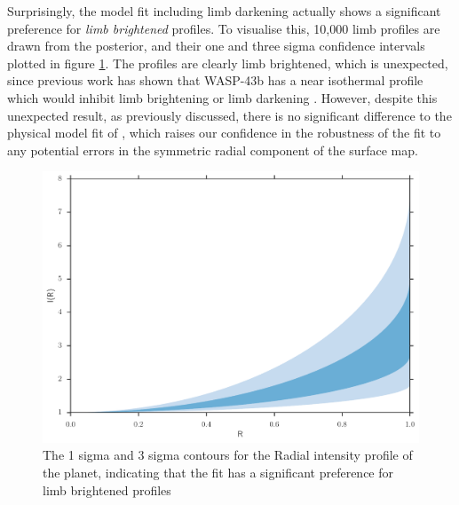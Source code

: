 \documentclass[a4paper,fleqn,usenatbib]{mnras}
\begin{document}
Surprisingly, the model fit including limb darkening actually shows a significant preference for \emph{limb brightened} profiles. To visualise this, 10,000 limb profiles are drawn from the posterior, and their one and three sigma confidence intervals plotted in figure \ref{fig:limb brighten}. The profiles are clearly limb brightened, which is unexpected, since previous work has shown that WASP-43b has a near isothermal profile which would inhibit limb brightening or limb darkening \citep{Stevenson2014}. However, despite this unexpected result, as previously discussed, there is no significant difference to the physical model fit of \citep{Zhang2016}, which raises our confidence in the robustness of the fit to any potential errors in the symmetric radial component of the surface map.

\begin{figure}
\begin{center}
\includegraphics[width=\columnwidth]{img/ld_prof.pdf}
\caption{The 1 sigma and 3 sigma contours for the Radial intensity profile of the planet, indicating that the fit has a significant preference for limb brightened profiles }
\label{fig:limb brighten}
\end{center}
\end{figure}
\end{document}
